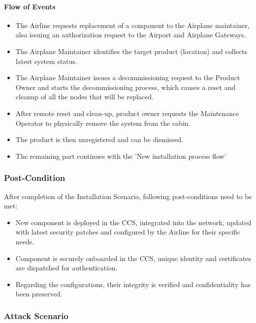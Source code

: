 \paragraph{Flow of Events}

\begin{itemize}
	\item The Airline requests replacement of a component to the Airplane maintainer, also issuing an authorization
	      request to the Airport and Airplane Gateways.
	\item The Airplane Maintainer identifies the target product (location) and collects latest system status.
	\item The Airplane Maintainer issues a decommissioning request to the Product Owner and starts the
	      decommissioning process, which causes a reset and cleanup of all the nodes that will be replaced.
	\item After remote reset and clean-up, product owner requests the Maintenance Operator to physically remove the
	      system from the cabin.
	\item The product is then unregistered and can be dismissed.
	\item The remaining part continues with the 'New installation process flow'
\end{itemize}

\subsubsection{Post-Condition}

After completion of the Installation Scenario, following post-conditions need to be met:

\begin{itemize}
	\item New component is deployed in the CCS, integrated into the network, updated with latest security patches
	      and configured by the Airline for their specific needs.
	\item Component is securely onboarded in the CCS, unique identity and certificates are dispatched for
	      authentication.
	\item Regarding the configurations, their integrity is verified and confidentiality has been preserved.
\end{itemize}

\subsubsection{Attack Scenario}

